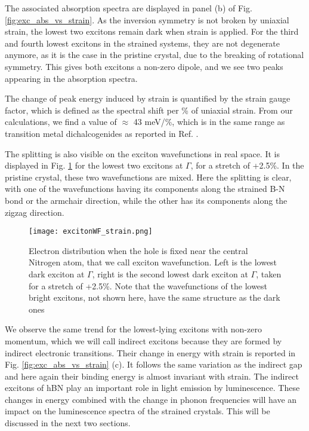 The associated absorption spectra are displayed in panel (b) of Fig. \ref{fig:exc_abs_vs_strain}. As the inversion symmetry is not broken by uniaxial strain, the lowest two excitons remain dark when strain is applied. For the third and fourth lowest excitons in the strained systems, they are not degenerate anymore, as it is the case in the pristine crystal, due to the breaking of rotational symmetry. This gives both excitons a non-zero dipole, and we see two peaks appearing in the absorption spectra. 

The change of peak energy induced by strain is quantified by the strain gauge factor, which is defined as the spectral shift per \% of uniaxial strain. From our calculations, we find a value of $\approx$ 43 meV/\%, which is in the same range as transition metal dichalcogenides as reported in Ref. \cite{carrascoso2021strain}.

The splitting is also visible on the exciton wavefunctions in real space. It is displayed in Fig. \ref{fig:excWF_strain} for the lowest two excitons at $\Gamma$, for a stretch of +2.5\%. In the pristine crystal, these two wavefunctions are mixed. Here the splitting is clear, with one of the wavefunctions having its components along the strained B-N bond or the armchair direction, while the other has its components along the zigzag direction.
\begin{figure}[tbp]
	\vspace{0.2cm}
	\setcapindent{2em}
	\centering
	\texttt{[image: excitonWF\_strain.png]}
	\caption{Electron distribution when the hole is fixed near the central Nitrogen atom, that we call exciton wavefunction. Left is the lowest dark exciton at $\Gamma$, right is the second lowest dark exciton at $\Gamma$, taken for a stretch of +2.5\%. Note that the wavefunctions of the lowest bright excitons, not shown here, have the same structure as the dark ones}
	\label{fig:excWF_strain}
\end{figure}

We observe the same trend for the lowest-lying excitons with non-zero momentum, which we will call indirect excitons because they are formed by indirect electronic transitions. Their change in energy with strain is reported in Fig. \ref{fig:exc_abs_vs_strain} (c). It follows the same variation as the indirect gap and here again their binding energy is almost invariant with strain. The indirect excitons of hBN play an important role in light emission by luminescence. These changes in energy combined with the change in phonon frequencies will have an impact on the luminescence spectra of the strained crystals. This will be discussed in the next two sections.

